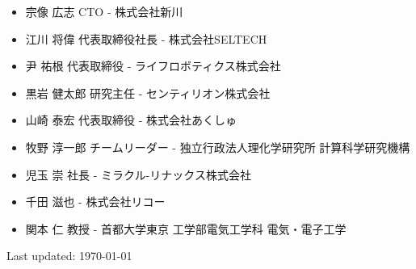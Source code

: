 \documentclass[letterpaper]{article}
\def\footer{
  \begin{center}
    \begin{footnotesize}
      Last updated: \today
    \end{footnotesize}
  \end{center}
}
\begin{document}
\begin{itemize}
  \item 宗像 広志 CTO - 株式会社新川
  \item 江川 将偉 代表取締役社長 - 株式会社SELTECH
  \item 尹 祐根 代表取締役 - ライフロボティクス株式会社
  \item 黒岩 健太郎 研究主任 - センティリオン株式会社
  \item 山崎 泰宏 代表取締役 - 株式会社あくしゅ
  \item 牧野 淳一郎 チームリーダー - 独立行政法人理化学研究所 計算科学研究機構
  \item 児玉 崇 社長 - ミラクル-リナックス株式会社
  \item 千田 滋也 - 株式会社リコー
  \item 関本 仁 教授 - 首都大学東京 工学部電気工学科 電気・電子工学
\end{itemize}

\bigskip
\footer
\end{document}
